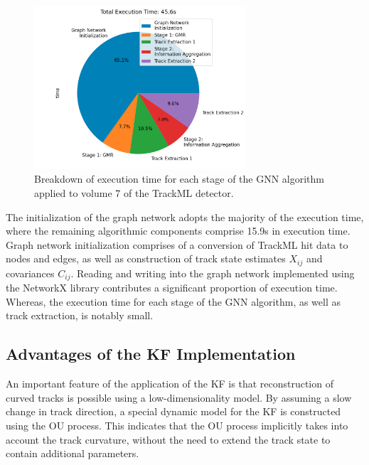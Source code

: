 \begin{figure}[htbp]
    \centering
    \includegraphics[width=0.7\textwidth]{images/7-results/execution-time-endcap-1.png}
    \caption{Breakdown of execution time for each stage of the GNN algorithm applied to volume 7 of the TrackML detector.}
    \label{fig:execution-time-endcap-1}%
\end{figure}



The initialization of the graph network adopts the majority of the execution time, where the remaining algorithmic components comprise 15.9s in execution time. Graph network initialization comprises of a conversion of TrackML hit data to nodes and edges, as well as construction of track state estimates $X_{ij}$ and covariances $C_{ij}$. Reading and writing into the graph network implemented using the NetworkX library contributes a significant proportion of execution time. Whereas, the execution time for each stage of the GNN algorithm, as well as track extraction, is notably small.





\subsection{Advantages of the KF Implementation}

An important feature of the application of the KF is that reconstruction of curved tracks is possible using a low-dimensionality model. By assuming a slow change in track direction, a special dynamic model for the KF is constructed using the OU process. This indicates that the OU process implicitly takes into account the track curvature, without the need to extend the track state to contain additional parameters.








